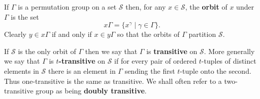 If $\Gamma$ is a permutation group on a set $\mathcal{S}$ then, for any $x \in \mathcal{S}$, the \textbf{orbit} of $x$ under $\Gamma$ is the set
$$x\Gamma = \{x^\gamma \mid \gamma \in \Gamma\}.$$
Clearly $y \in x\Gamma$ if and only if $x \in y\Gamma$ so that the orbits of $\Gamma$ partition $\mathcal{S}$.

If $\mathcal{S}$ is the only orbit of $\Gamma$ then we say that $\Gamma$ is \textbf{transitive} on $\mathcal{S}$. More generally we say that $\Gamma$ is \textbf{$t$-transitive} on $\mathcal{S}$ if for every pair of ordered $t$-tuples of distinct elements in $\mathcal{S}$ there is an element in $\Gamma$ sending the first $t$-tuple onto the second. Thus one-transitive is the same as transitive. We shall often refer to a two-transitive group as being \textbf{doubly transitive}.
